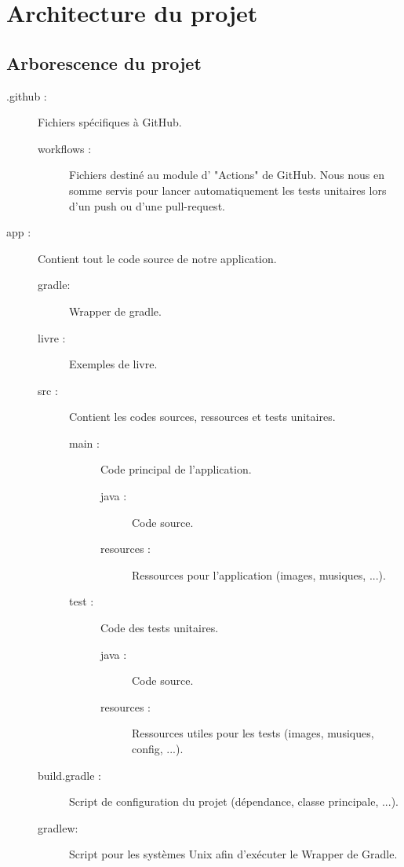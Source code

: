 \chapter{Architecture du projet}

	\section{Arborescence du projet}

		\begin{description}
			\item[.github :]{Fichiers spécifiques à GitHub.}
			\begin{description}
				\item[workflows :]{Fichiers destiné au module d' "Actions" de GitHub. Nous nous en somme servis pour lancer automatiquement les tests unitaires lors d'un push ou d'une pull-request.}
			\end{description}
			\item[app :]{Contient tout le code source de notre application.}
			\begin{description}
				\item[gradle:]{Wrapper de gradle.}
				\item[livre :]{Exemples de livre.}
				\item[src :]{Contient les codes sources, ressources et tests unitaires.}
				\begin{description}
					\item[main :]{Code principal de l'application.}
					\begin{description}
						\item[java :]{Code source.}
						\item[resources :]{Ressources pour l'application (images, musiques, ...).}
					\end{description}
					\item[test :]{Code des tests unitaires.}
					\begin{description}
						\item[java :]{Code source.}
						\item[resources :]{Ressources utiles pour les tests (images, musiques, config, ...).}
					\end{description}
				\end{description}
				\item[build.gradle :]{Script de configuration du projet (dépendance, classe principale, ...).}
				\item[gradlew:]{Script pour les systèmes Unix afin d'exécuter le Wrapper de Gradle.}

\end{description}
\end{description}
